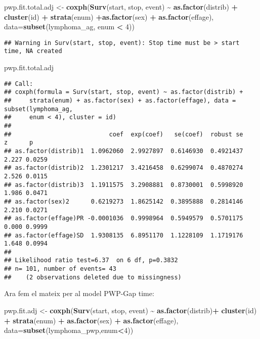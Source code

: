 \documentclass[
]{article}
\newenvironment{Shaded}{\begin{snugshade}}{\end{snugshade}}
\newcommand{\AttributeTok}[1]{\textcolor[rgb]{0.13,0.29,0.53}{#1}}
\newcommand{\DecValTok}[1]{\textcolor[rgb]{0.00,0.00,0.81}{#1}}
\newcommand{\FunctionTok}[1]{\textcolor[rgb]{0.13,0.29,0.53}{\textbf{#1}}}
\newcommand{\NormalTok}[1]{#1}
\newcommand{\OtherTok}[1]{\textcolor[rgb]{0.56,0.35,0.01}{#1}}
\newcommand{\SpecialCharTok}[1]{\textcolor[rgb]{0.81,0.36,0.00}{\textbf{#1}}}
\begin{document}
\begin{Shaded}
\begin{Highlighting}[]
\NormalTok{pwp.fit.total.adj }\OtherTok{\textless{}{-}} \FunctionTok{coxph}\NormalTok{(}\FunctionTok{Surv}\NormalTok{(start, stop, event) }\SpecialCharTok{\textasciitilde{}} \FunctionTok{as.factor}\NormalTok{(distrib) }\SpecialCharTok{+} \FunctionTok{cluster}\NormalTok{(id) }\SpecialCharTok{+} \FunctionTok{strata}\NormalTok{(enum) }\SpecialCharTok{+}\FunctionTok{as.factor}\NormalTok{(sex) }\SpecialCharTok{+} \FunctionTok{as.factor}\NormalTok{(effage), }\AttributeTok{data=}\FunctionTok{subset}\NormalTok{(lymphoma\_ag, enum }\SpecialCharTok{\textless{}} \DecValTok{4}\NormalTok{))}
\end{Highlighting}
\end{Shaded}

\begin{verbatim}
## Warning in Surv(start, stop, event): Stop time must be > start time, NA created
\end{verbatim}

\begin{Shaded}
\begin{Highlighting}[]
\NormalTok{pwp.fit.total.adj}
\end{Highlighting}
\end{Shaded}

\begin{verbatim}
## Call:
## coxph(formula = Surv(start, stop, event) ~ as.factor(distrib) + 
##     strata(enum) + as.factor(sex) + as.factor(effage), data = subset(lymphoma_ag, 
##     enum < 4), cluster = id)
## 
##                           coef  exp(coef)   se(coef)  robust se     z      p
## as.factor(distrib)1  1.0962060  2.9927897  0.6146930  0.4921437 2.227 0.0259
## as.factor(distrib)2  1.2301217  3.4216458  0.6299074  0.4870274 2.526 0.0115
## as.factor(distrib)3  1.1911575  3.2908881  0.8730001  0.5998920 1.986 0.0471
## as.factor(sex)2      0.6219273  1.8625142  0.3895888  0.2814146 2.210 0.0271
## as.factor(effage)PR -0.0001036  0.9998964  0.5949579  0.5701175 0.000 0.9999
## as.factor(effage)SD  1.9308135  6.8951170  1.1228109  1.1719176 1.648 0.0994
## 
## Likelihood ratio test=6.37  on 6 df, p=0.3832
## n= 101, number of events= 43 
##    (2 observations deleted due to missingness)
\end{verbatim}

Ara fem el mateix per al model PWP-Gap time:

\begin{Shaded}
\begin{Highlighting}[]
\NormalTok{pwp.fit.adj }\OtherTok{\textless{}{-}} \FunctionTok{coxph}\NormalTok{(}\FunctionTok{Surv}\NormalTok{(start, stop, event) }\SpecialCharTok{\textasciitilde{}} \FunctionTok{as.factor}\NormalTok{(distrib)}\SpecialCharTok{+}
                  \FunctionTok{cluster}\NormalTok{(id) }\SpecialCharTok{+} \FunctionTok{strata}\NormalTok{(enum) }\SpecialCharTok{+} \FunctionTok{as.factor}\NormalTok{(sex) }\SpecialCharTok{+} \FunctionTok{as.factor}\NormalTok{(effage), }\AttributeTok{data=}\FunctionTok{subset}\NormalTok{(lymphoma\_pwp,enum}\SpecialCharTok{\textless{}}\DecValTok{4}\NormalTok{))}
\end{Highlighting}
\end{Shaded}
\end{document}
